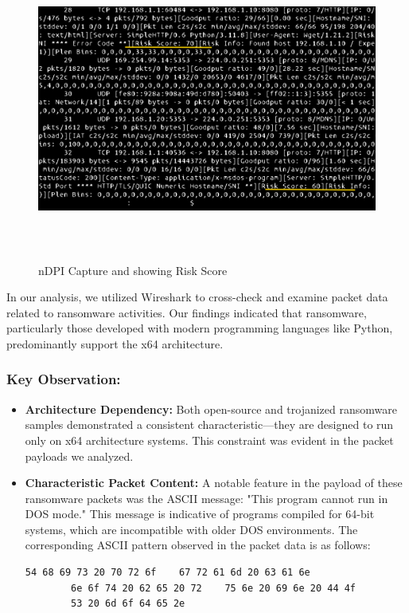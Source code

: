 \documentclass[12pt,letterpaper]{article}
\begin{document}
\begin{itemize}
   \begin{figure}[httb]
       \centering
       \includegraphics[width = \textwidth, height = 10cm]{images/risk_score.pdf}
       \caption{nDPI Capture and showing Risk Score}
       \label{fig: nDPI Capture and showing Risk Score}
   \end{figure}

  In our analysis, we utilized Wireshark to cross-check and examine packet data related to ransomware activities. Our findings indicated that ransomware, particularly those developed with modern programming languages like Python, predominantly support the x64 architecture.

  \subsubsection{Key Observation:}
    \begin{itemize}
        \item \textbf{Architecture Dependency:} Both open-source and trojanized ransomware samples demonstrated a consistent characteristic—they are designed to run only on x64 architecture systems. This constraint was evident in the packet payloads we analyzed.

        \item \textbf{Characteristic Packet Content:} A notable feature in the payload of these ransomware packets was the ASCII message: "This program cannot run in DOS mode." This message is indicative of programs compiled for 64-bit systems, which are incompatible with older DOS environments. The corresponding ASCII pattern observed in the packet data is as follows:

\begin{lstlisting}[language=bash]
        54 68 69 73 20 70 72 6f    67 72 61 6d 20 63 61 6e
        6e 6f 74 20 62 65 20 72    75 6e 20 69 6e 20 44 4f
        53 20 6d 6f 64 65 2e 
\end{lstlisting}
    \end{itemize}

         \end{itemize}      
\end{document}
